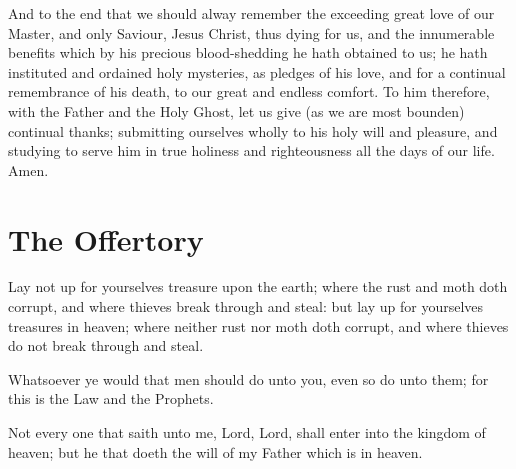 And to the end that we should alway remember the exceeding great love of our Master, and only Saviour, Jesus Christ, thus dying for us, and the innumerable benefits which by his precious blood-shedding he hath obtained to us; he hath instituted and ordained holy mysteries, as pledges of his love, and for a continual remembrance of his death, to our great and endless comfort. To him therefore, with the Father and the Holy Ghost, let us give (as we are most bounden) continual thanks; submitting ourselves wholly to his holy will and pleasure, and studying to serve him in true holiness and righteousness all the days of our life. Amen.


\bigskip

\section{The Offertory}
\label{offertory}



Lay not up for yourselves treasure upon the earth; where the rust and moth doth corrupt, and where thieves break through and steal: but lay up for yourselves treasures in heaven; where neither rust nor moth doth corrupt, and where thieves do not break through and steal.

Whatsoever ye would that men should do unto you, even so do unto them; for this is the Law and the Prophets.

Not every one that saith unto me, Lord, Lord, shall enter into the kingdom of heaven; but he that doeth the will of my Father which is in heaven.

